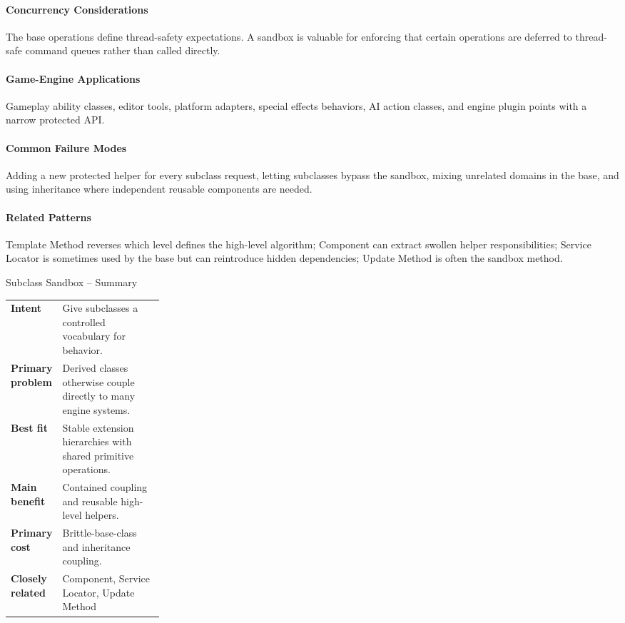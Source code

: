 \documentclass[11pt]{article}
\begin{document}
\paragraph{Concurrency Considerations} The base operations define thread-safety expectations. A sandbox is valuable for enforcing that certain operations are deferred to thread-safe command queues rather than called directly.
\paragraph{Game-Engine Applications} Gameplay ability classes, editor tools, platform adapters, special effects behaviors, AI action classes, and engine plugin points with a narrow protected API.
\paragraph{Common Failure Modes} Adding a new protected helper for every subclass request, letting subclasses bypass the sandbox, mixing unrelated domains in the base, and using inheritance where independent reusable components are needed.
\paragraph{Related Patterns} Template Method reverses which level defines the high-level algorithm; Component can extract swollen helper responsibilities; Service Locator is sometimes used by the base but can reintroduce hidden dependencies; Update Method is often the sandbox method.

\begin{patternsummary}{Subclass Sandbox -- Summary}
\begin{tabularx}{\linewidth}{@{}>{\bfseries}p{0.25\linewidth}X@{}}
Intent & Give subclasses a controlled vocabulary for behavior. \\
Primary problem & Derived classes otherwise couple directly to many engine systems. \\
Best fit & Stable extension hierarchies with shared primitive operations. \\
Main benefit & Contained coupling and reusable high-level helpers. \\
Primary cost & Brittle-base-class and inheritance coupling. \\
Closely related & Component, Service Locator, Update Method \\
\end{tabularx}
\end{patternsummary}
\end{document}
